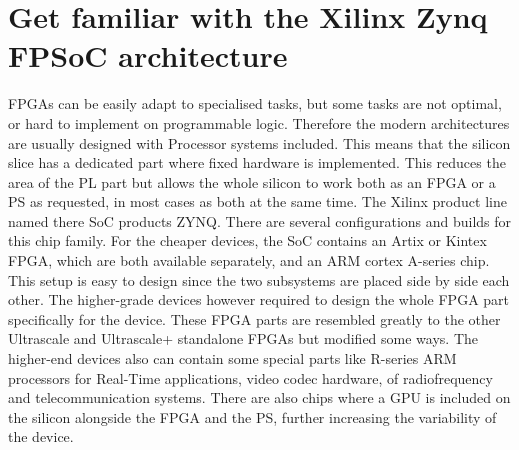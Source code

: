 \section{Get familiar with the Xilinx Zynq FPSoC architecture} %
FPGAs can be easily adapt to specialised tasks, but some tasks are not optimal, or hard to implement on programmable logic.
Therefore the modern architectures are usually designed with Processor systems included.
This means that the silicon slice has a dedicated part where fixed hardware is implemented.
This reduces the area of the PL part but allows the whole silicon to work both as an FPGA or a PS as requested, in most cases as both at the same time.
The Xilinx product line named there SoC products ZYNQ.
There are several configurations and builds for this chip family.
For the cheaper devices, the SoC contains an Artix or Kintex FPGA, which are both available separately, and an ARM cortex A-series chip.
This setup is easy to design since the two subsystems are placed side by side each other.
The higher-grade devices however required to design the whole FPGA part specifically for the device.
These FPGA parts are resembled greatly to the other Ultrascale and Ultrascale+ standalone FPGAs but modified some ways.
The higher-end devices also can contain some special parts like R-series ARM processors for Real-Time applications, video codec hardware, of radiofrequency and telecommunication systems.
There are also chips where a GPU is included on the silicon alongside the FPGA and the PS, further increasing the variability of the device.

